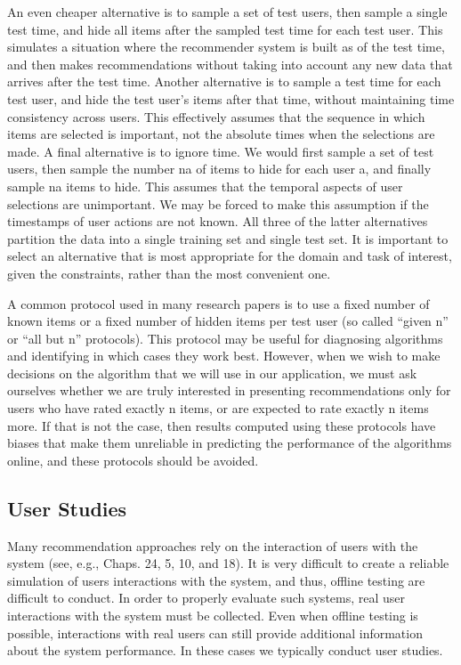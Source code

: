 An even cheaper alternative is to sample a set of test users, then sample a single test time, and hide all items after the sampled test time for each test user. This simulates a situation where the recommender system is built as of the test time, and then makes recommendations without taking into account any new data that arrives after the test time. Another alternative is to sample a test time for each test user, and hide the test user’s items after that time, without maintaining time consistency across users. This effectively assumes that the sequence in which items are selected is important, not the absolute times when the selections are made. A final alternative is to ignore time. We would first sample a set of test users, then sample the number na of items to hide for each user a, and finally sample na items to hide. This assumes that the temporal aspects of user selections are unimportant. We may be forced to make this assumption if the timestamps of user actions are not known. All three of the latter alternatives partition the data into a single training set and single test set. It is important to select an alternative that is most appropriate for the domain and task of interest, given the constraints, rather than the most convenient one.

A common protocol used in many research papers is to use a fixed number of known items or a fixed number of hidden items per test user (so called “given n” or “all but n” protocols). This protocol may be useful for diagnosing algorithms and identifying in which cases they work best. However, when we wish to make decisions on the algorithm that we will use in our application, we must ask ourselves whether we are truly interested in presenting recommendations only for users who have rated exactly n items, or are expected to rate exactly n items more. If that is not the case, then results computed using these protocols have biases that make them unreliable in predicting the performance of the algorithms online, and these protocols should be avoided.

\subsection{User Studies}

Many recommendation approaches rely on the interaction of users with the system (see, e.g., Chaps. 24, 5, 10, and 18). It is very difficult to create a reliable simulation of users interactions with the system, and thus, offline testing are difficult to conduct. In order to properly evaluate such systems, real user interactions with the system must be collected. Even when offline testing is possible, interactions with real users can still provide additional information about the system performance. In these cases we typically conduct user studies.

